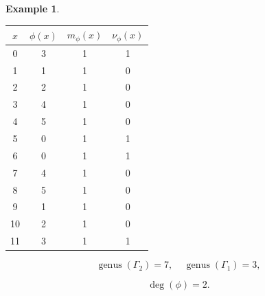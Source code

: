 \documentclass[12pt,letterpaper]{article}
\theoremstyle{definition}
\newtheorem{example}[theorem]{Example}
\DeclareMathOperator{\genus}{genus}
\begin{document}
\begin{example}
{\begin{center}
\begin{tabular}{c|c|c|c}  
  $x$ & $\phi(x)$ & $m_\phi(x)$ & $\nu_\phi(x)$ \\ \hline
  0   &    3   &        1         &  1   \\ 
  1   &    1   &        1         &  0  \\ 
  2   &    2   &        1         &  0  \\ 
  3   &    4   &        1         &  0  \\ 
  4   &    5   &        1         &  0   \\ 
  5   &    0   &        1         &  1    \\ 
  6   &    0   &        1         &  1   \\ 
  7   &    4   &        1         &  0   \\
  8   &    5   &        1         &  0   \\
  9   &    1   &        1         &  0   \\
  10  &    2   &        1         &  0   \\
  11  &    3   &        1         &  1   \\ 
\end{tabular}
\end{center}

\[
  \genus(\Gamma_2) =7,\ \ \ \ \
  \genus(\Gamma_1) =3,
\]

\[
\deg(\phi) =2.
\]

}
\end{example}
\end{document}
